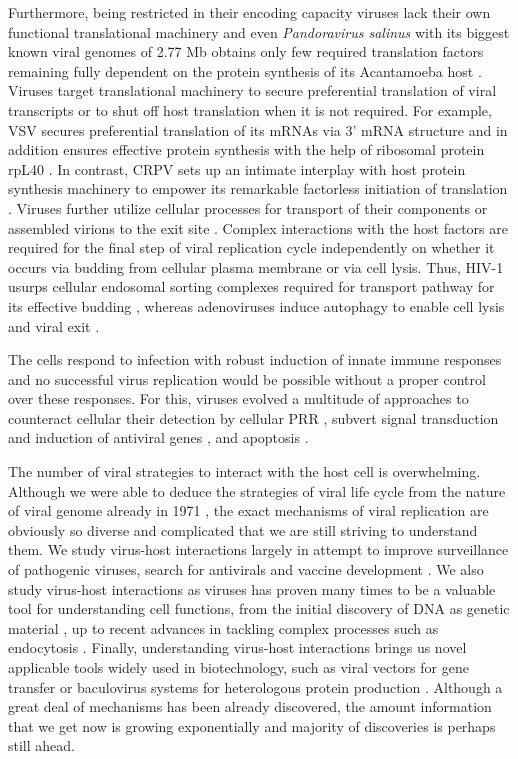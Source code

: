 	Furthermore, being restricted in their encoding capacity viruses lack their own functional translational machinery and even \textit{Pandoravirus salinus} with its biggest known viral genomes of 2.77 \gls{Mb} obtains only few required translation factors remaining fully dependent on the protein synthesis of its Acantamoeba host \parencite{Philippe2013}. Viruses target translational machinery to secure preferential translation of viral transcripts or to shut off host translation when it is not required. For example, \gls{VSV} secures preferential translation of its mRNAs via 3' mRNA structure \parencite{Whitlow2006} and in addition ensures effective protein synthesis with the help of ribosomal protein rpL40 \parencite{Lee2013}. In contrast, \gls{CRPV} sets up an intimate interplay with host protein synthesis machinery to empower its remarkable factorless initiation of translation \parencite{Bushell2002}. Viruses further utilize cellular processes for transport of their components or assembled virions to the exit site \parencite{Bartenschlager2011, Lyles2013}. Complex interactions with the host factors are required for the final step of viral replication cycle independently on whether it occurs via budding from cellular plasma membrane or via cell lysis. Thus, HIV-1 usurps cellular endosomal sorting complexes required for transport pathway for its effective budding \parencite{Morita2011}, whereas adenoviruses induce autophagy to enable cell lysis and viral exit \parencite{Jiang2011}.
	
	The cells respond to infection with robust induction of innate immune responses and no successful virus replication would be possible without a proper control over these responses. For this, viruses evolved a multitude of approaches to counteract cellular their detection by cellular \gls{PRR} \parencite{Zinzula2013}, subvert signal transduction and induction of antiviral genes \parencite{Short2009}, and apoptosis \parencite{Galluzzi2008}.
	
	The number of viral strategies to interact with the host cell is overwhelming. Although we were able to deduce the strategies of viral life cycle from the nature of viral genome already in 1971 \parencite{Baltimore1971}, the exact mechanisms of viral replication are obviously so diverse and complicated that we are still striving to understand them. We study virus-host interactions largely in attempt to improve surveillance of pathogenic viruses, search for antivirals and vaccine development \parencite{Webby2003, Schwegmann2008}. We also study virus-host interactions as viruses has proven many times to be a valuable tool for understanding cell functions, from the initial discovery of DNA as genetic material \parencite{Hershey1952}, up to recent advances in tackling complex processes such as endocytosis \parencite{Pelkmans2003}. Finally, understanding virus-host interactions brings us novel applicable tools widely used in biotechnology, such as viral vectors for gene transfer \parencite{Vannucci2013} or baculovirus systems for heterologous protein production \parencite{VanOers2011}. Although a great deal of mechanisms has been already discovered, the amount information that we get now is growing exponentially and majority of discoveries is perhaps still ahead. 
		
